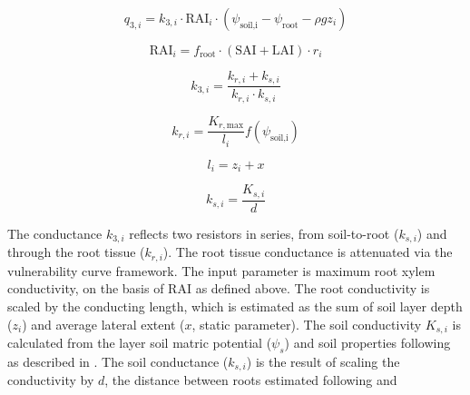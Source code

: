 \documentclass[draft,linenumbers]{agujournal}
\begin{document}
\begin{linenomath*} \begin{equation}
q_{3,i} = k_{3,i} \cdot  \text{RAI}_i  \cdot \left( \psi_{\text{soil,i}}-\psi_{\text{root}}-\rho g z_i\right)
\end{equation} \end{linenomath*}
\begin{linenomath*} \begin{equation}
\text{RAI}_i=f_{\text{root}} \cdot \left( \text{SAI} + \text{LAI} \right) \cdot r_i
\label{eq:rai}
\end{equation} \end{linenomath*}
\begin{linenomath*} \begin{equation}
k_{3,i} = \dfrac{k_{r,i}+k_{s,i}}{k_{r,i}\cdot k_{s,i}}
\end{equation} \end{linenomath*}
\begin{linenomath*} \begin{equation}
k_{r,i} = \dfrac{K_{r,\text{max}}}{l_i} f \left(\psi_{\text{soil,i}}\right)
\end{equation} \end{linenomath*}
\begin{linenomath*} \begin{equation}
l_i = z_i + x
\end{equation} \end{linenomath*}
\begin{linenomath*} \begin{equation}
k_{s,i} = \dfrac{K_{s,i}}{d}
\end{equation} \end{linenomath*}

The conductance $k_{3,i}$ reflects two resistors in series, from soil-to-root ($k_{s,i}$) and through the
root tissue ($k_{r,i}$).
The root tissue conductance is attenuated via the vulnerability curve framework. 
The input parameter is maximum root xylem conductivity, on the basis of RAI as defined above.
The root conductivity is scaled by the conducting length, which is estimated as the sum of soil layer depth ($z_i$)
and average lateral extent ($x$, static parameter).
The soil conductivity $K_{s,i}$ is calculated from the layer soil matric potential ($\psi_s$) 
and soil properties following \citet{clapp1978} as described in \citet{oleson2013}.
The soil conductance ($k_{s,i}$) is the result of scaling the conductivity by $d$, 
 the distance between roots estimated following \citet{williams1996} and \citet{bonan2014}
\end{document}
